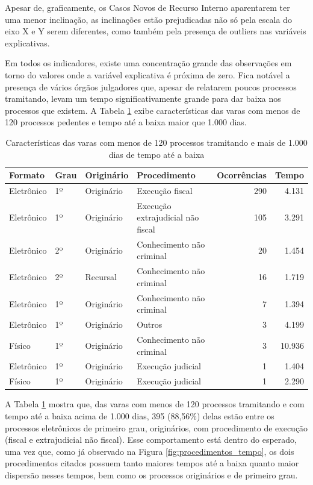 Apesar de, graficamente, os Casos Novos de Recurso Interno aparentarem ter uma menor inclinação, as inclinações estão prejudicadas não só pela escala do eixo X e Y serem diferentes, como também pela presença de outliers nas variáveis explicativas.

Em todos os indicadores, existe uma concentração grande das observações em torno do valores onde a variável explicativa é próxima de zero. Fica notável a presença de vários órgãos julgadores que, apesar de relatarem poucos processos tramitando, levam um tempo significativamente grande para dar baixa nos processos que existem. A Tabela \ref{tbl:caracteristicas_pendentes_tempo_longo} exibe características das varas com menos de 120 processos pedentes e tempo até a baixa maior que 1.000 dias. 

\begin{table}[ht]
\centering
\caption{Características das varas com menos de 120 processos tramitando e mais de 1.000 dias de tempo até a baixa}
\begin{tabular}{llllrr}
  \hline
  Formato & Grau & Originário & Procedimento & Ocorrências & Tempo \\ 
  \hline
  Eletrônico & 1º & Originário & Execução fiscal & 290 & 4.131 \\ 
  Eletrônico & 1º & Originário & Execução extrajudicial não fiscal & 105 & 3.291 \\ 
  Eletrônico & 2º & Originário & Conhecimento não criminal &  20 & 1.454 \\ 
  Eletrônico & 2º & Recursal & Conhecimento não criminal &  16 & 1.719 \\ 
  Eletrônico & 1º & Originário & Conhecimento não criminal &   7 & 1.394 \\ 
  Eletrônico & 1º & Originário & Outros &   3 & 4.199 \\ 
  Físico &     1º & Originário & Conhecimento não criminal &   3 & 10.936 \\ 
  Eletrônico & 1º & Originário & Execução judicial &   1 & 1.404 \\ 
  Físico &     1º & Originário & Execução judicial &   1 & 2.290 \\ 
   \hline
\end{tabular}
\label{tbl:caracteristicas_pendentes_tempo_longo}
\end{table}

A Tabela \ref{tbl:caracteristicas_pendentes_tempo_longo} mostra que, das varas com menos de 120 processos tramitando e com tempo até a baixa acima de 1.000 dias, 395 (88,56\%) delas estão entre os processos eletrônicos de primeiro grau, originários, com procedimento de execução (fiscal e extrajudicial não fiscal). Esse comportamento está dentro do  esperado, uma vez que, como já observado na Figura \ref{fig:procedimentos_tempo}, os dois procedimentos citados possuem tanto maiores tempos até a baixa quanto maior dispersão nesses tempos, bem como os processos originários e de primeiro grau.

